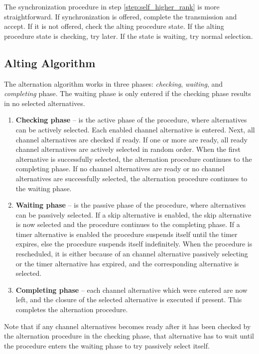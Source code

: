The synchronization procedure in step \ref{step:self_higher_rank} is more straightforward. If synchronization is offered, complete the transmission and accept. If it is not offered, check the alting procedure state. If the alting procedure state is checking, try later. If the state is waiting, try normal selection. 


\subsection{Alting Algorithm}
\label{subsec:alting_algorithm}


The alternation algorithm works in three phases: \textit{checking}, \textit{waiting}, and \textit{completing} phase. The waiting phase is only entered if the checking phase results in no selected alternatives.

\begin{enumerate}[topsep=0em,itemsep=-1em,partopsep=0.5em,parsep=1em]
    \item \textbf{Checking phase} -- is the active phase of the procedure, where alternatives can be actively selected. Each enabled channel alternative is entered. Next, all channel alternatives are checked if ready. If one or more are ready, all ready channel alternatives are actively selected in random order. When the first alternative is successfully selected, the alternation procedure continues to the completing phase. If no channel alternatives are ready or no channel alternatives are successfully selected, the alternation procedure continues to the waiting phase.
    \item \textbf{Waiting phase} -- is the passive phase of the procedure, where alternatives can be passively selected. If a skip alternative is enabled, the skip alternative is now selected and the procedure continues to the completing phase. If a timer alternative is enabled the procedure suspends itself until the timer expires, else the procedure suspends itself indefinitely. When the procedure is rescheduled, it is either because of an channel alternative passively selecting or the timer alternative has expired, and the corresponding alternative is selected.
    \item \textbf{Completing phase} -- each channel alternative which were entered are now left, and the closure of the selected alternative is executed if present. This completes the alternation procedure.
\end{enumerate}

Note that if any channel alternatives becomes ready after it has been checked by the alternation procedure in the checking phase, that alternative has to wait until the procedure enters the waiting phase to try passively select itself.

